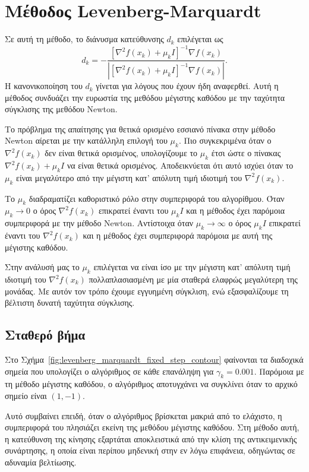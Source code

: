 \documentclass[a4paper,12pt]{article}
\begin{document}
\section*{Μέθοδος  Levenberg-Marquardt}
Σε αυτή τη μέθοδο, το διάνυσμα κατεύθυνσης $d_k$ επιλέγεται ως 
\[d_k = -\frac{[\nabla^2 f(x_k) + \mu_k I]^{-1} \nabla f(x_k)}{|[\nabla^2 f(x_k) + \mu_k I]^{-1} \nabla f(x_k)|}.\]
Η κανονικοποίηση του $d_k$ γίνεται για λόγους που έχουν ήδη αναφερθεί. Αυτή η μέθοδος συνδυάζει την
ευρωστία της μεθόδου μέγιστης καθόδου με την ταχύτητα σύγκλισης της μεθόδου Newton.

Το πρόβλημα της απαίτησης για θετικά ορισμένο εσσιανό πίνακα στην μέθοδο
Newton αίρεται με την κατάλληλη επιλογή του $\mu_k$. Πιο συγκεκριμένα όταν ο $\nabla^2 f(x_k)$ 
δεν είναι θετικά ορισμένος, υπολογίζουμε το $\mu_k$ έτσι ώστε ο πίνακας $\nabla^2 f(x_k) + \mu_k I$ να είναι θετικά 
ορισμένος. Αποδεικνύεται ότι αυτό ισχύει όταν το $\mu_k$ είναι μεγαλύτερο από την μέγιστη κατ' απόλυτη τιμή ιδιοτιμή του
$\nabla^2 f(x_k)$. 

Το $\mu_k$ διαδραματίζει καθοριστικό ρόλο στην συμπεριφορά του αλγορίθμου. Όταν $\mu_k \to 0$ 
ο όρος $\nabla^2 f(x_k)$ επικρατεί έναντι του $\mu_k I$ και η μέθοδος έχει παρόμοια συμπεριφορά με την μέθοδο 
Newton. Αντίστοιχα όταν $\mu_k \to \infty$ ο όρος $\mu_k I$ επικρατεί
έναντι του $\nabla^2 f(x_k)$ και η μέθοδος έχει συμπεριφορά παρόμοια με αυτή της μέγιστης καθόδου. 

Στην ανάλυσή μας το $\mu_k$ επιλέγεται να είναι ίσο με την μέγιστη κατ' απόλυτη τιμή ιδιοτιμή του $\nabla^2 f(x_k)$ 
πολλαπλασιασμένη με μία σταθερά ελαφρώς μεγαλύτερη της μονάδας. Με αυτόν τον τρόπο έχουμε εγγυημένη σύγκλιση, 
ενώ εξασφαλίζουμε τη βέλτιστη δυνατή ταχύτητα σύγκλισης.

\subsection*{Σταθερό βήμα}
Στο Σχήμα~\ref{fig:levenberg_marquardt_fixed_step_contour} φαίνονται τα διαδοχικά σημεία που υπολογίζει ο αλγόριθμος σε 
κάθε επανάληψη για $\gamma_k = 0.001$. Παρόμοια με τη μέθοδο μέγιστης καθόδου, ο αλγόριθμος αποτυγχάνει να συγκλίνει
όταν το αρχικό σημείο είναι $(1, -1)$. 

Αυτό συμβαίνει επειδή, όταν ο αλγόριθμος βρίσκεται μακριά από το ελάχιστο, η συμπεριφορά του πλησιάζει εκείνη της
μεθόδου μέγιστης καθόδου. Στη μέθοδο αυτή, η κατεύθυνση της κίνησης εξαρτάται αποκλειστικά από την κλίση της
αντικειμενικής συνάρτησης, η οποία είναι περίπου μηδενική στην εν λόγω επιφάνεια, οδηγώντας σε αδυναμία βελτίωσης.
\end{document}
